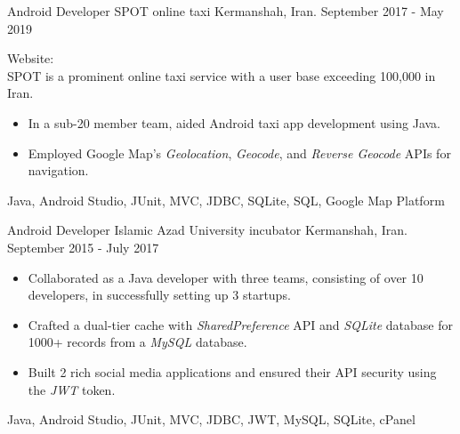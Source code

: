 \begin{experiences}
\emptySeparator
\experience
  {}
  {Android Developer}
  {SPOT online taxi}
  {Kermanshah, Iran. \hspace{140 pt} September 2017 - May 2019}
  {}
  {
  Website: \\
  SPOT is a prominent online taxi service with a user base exceeding 100,000 in Iran. 
  \begin{itemize}
    \item In a sub-20 member team, aided Android taxi app development using Java.
    \item Employed Google Map's \emph{Geolocation}, \emph{Geocode}, and \emph{Reverse Geocode} APIs for navigation.\end{itemize}
  }{Java, Android Studio, JUnit, MVC, JDBC, SQLite, SQL, Google Map Platform}

\emptySeparator

\experience
{}
{Android Developer}
{Islamic Azad University incubator}
{Kermanshah, Iran. \hspace{60 pt} September 2015 - July 2017}
{}
{
\begin{itemize}
\item Collaborated as a Java developer with three teams, consisting of over 10 developers, in successfully setting up 3 startups.
\item Crafted a dual-tier cache with \emph{SharedPreference} API and \emph{SQLite} database for 1000+ records from a \emph{MySQL} database.
\item Built 2 rich social media applications and ensured their API security using the \emph{JWT} token.
\end{itemize}
}{Java, Android Studio, JUnit, MVC, JDBC, JWT, MySQL, SQLite, cPanel}
\end{experiences}